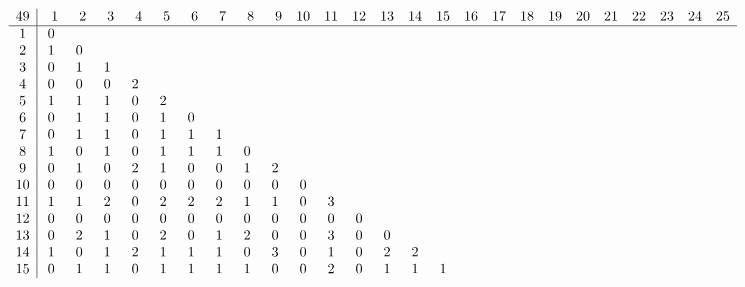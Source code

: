 \begin{landscape}
\[
\begin{array}{c|ccccccccccccccccccccccccc}\addcontentsline{lot}{table}{\protect\numberline{}Dimensions of the Kernel of $\mathcal{L}_{r,c,49}$}
49&  \phantom{0}1&  \phantom{0}2&  \phantom{0}3&  \phantom{0}4&  \phantom{0}5&  \phantom{0}6&  \phantom{0}7&  \phantom{0}8&  \phantom{0}9& 10& 11& 12& 13& 14& 15& 16& 17& 18& 19& 20& 21& 22& 23& 24& 25\\
\hline
 1&  0&   &   &   &   &   &   &   &   &   &   &   &   &   &   &   &   &   &   &   &   &   &   &   &   \\
 2&  1&  0&   &   &   &   &   &   &   &   &   &   &   &   &   &   &   &   &   &   &   &   &   &   &   \\
 3&  0&  1&  1&   &   &   &   &   &   &   &   &   &   &   &   &   &   &   &   &   &   &   &   &   &   \\
 4&  0&  0&  0&  2&   &   &   &   &   &   &   &   &   &   &   &   &   &   &   &   &   &   &   &   &   \\
 5&  1&  1&  1&  0&  2&   &   &   &   &   &   &   &   &   &   &   &   &   &   &   &   &   &   &   &   \\
 6&  0&  1&  1&  0&  1&  0&   &   &   &   &   &   &   &   &   &   &   &   &   &   &   &   &   &   &   \\
 7&  0&  1&  1&  0&  1&  1&  1&   &   &   &   &   &   &   &   &   &   &   &   &   &   &   &   &   &   \\
 8&  1&  0&  1&  0&  1&  1&  1&  0&   &   &   &   &   &   &   &   &   &   &   &   &   &   &   &   &   \\
 9&  0&  1&  0&  2&  1&  0&  0&  1&  2&   &   &   &   &   &   &   &   &   &   &   &   &   &   &   &   \\
10&  0&  0&  0&  0&  0&  0&  0&  0&  0&  0&   &   &   &   &   &   &   &   &   &   &   &   &   &   &   \\
11&  1&  1&  2&  0&  2&  2&  2&  1&  1&  0&  3&   &   &   &   &   &   &   &   &   &   &   &   &   &   \\
12&  0&  0&  0&  0&  0&  0&  0&  0&  0&  0&  0&  0&   &   &   &   &   &   &   &   &   &   &   &   &   \\
13&  0&  2&  1&  0&  2&  0&  1&  2&  0&  0&  3&  0&  0&   &   &   &   &   &   &   &   &   &   &   &   \\
14&  1&  0&  1&  2&  1&  1&  1&  0&  3&  0&  1&  0&  2&  2&   &   &   &   &   &   &   &   &   &   &   \\
15&  0&  1&  1&  0&  1&  1&  1&  1&  0&  0&  2&  0&  1&  1&  1&   &   &   &   &   &   &   &   &   &   \\

\end{array}\]
\end{landscape}
